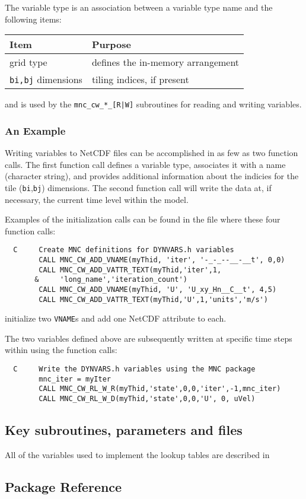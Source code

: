 The variable type is an association between a variable type name and the
following items:
\begin{center}
  \begin{tabular}[h]{|ll|}\hline
    \textbf{Item}  & \textbf{Purpose}  \\\hline
    grid type  &  defines the in-memory arrangement  \\
    \texttt{bi,bj} dimensions  &  tiling indices, if present  \\\hline
  \end{tabular}
\end{center}
and is used by the \texttt{mnc\_cw\_*\_[R|W]} subroutines for reading
and writing variables.


\subsubsection{An Example}

Writing variables to NetCDF files can be accomplished in as few as two
function calls.  The first function call defines a variable type,
associates it with a name (character string), and provides additional
information about the indicies for the tile (\texttt{bi},\texttt{bj})
dimensions.  The second function call will write the data at, if
necessary, the current time level within the model.

Examples of the initialization calls can be found in the file 
where these four function calls:
{\footnotesize
\begin{verbatim}
  C     Create MNC definitions for DYNVARS.h variables
        CALL MNC_CW_ADD_VNAME(myThid, 'iter', '-_-_--__-__t', 0,0)
        CALL MNC_CW_ADD_VATTR_TEXT(myThid,'iter',1,
       &     'long_name','iteration_count')
        CALL MNC_CW_ADD_VNAME(myThid, 'U', 'U_xy_Hn__C__t', 4,5)
        CALL MNC_CW_ADD_VATTR_TEXT(myThid,'U',1,'units','m/s')
\end{verbatim}
}
{\noindent initialize two \texttt{VNAME}s and add one NetCDF
  attribute to each.}
    
The two variables defined above are subsequently written at specific
time steps within
using the function calls:
{\footnotesize
\begin{verbatim}
  C     Write the DYNVARS.h variables using the MNC package
        mnc_iter = myIter
        CALL MNC_CW_RL_W_R(myThid,'state',0,0,'iter',-1,mnc_iter)
        CALL MNC_CW_RL_W_D(myThid,'state',0,0,'U', 0, uVel)
\end{verbatim}
}


\subsection{Key subroutines, parameters and files}

All of the variables used to implement the lookup tables are described
in 



\subsection{Package Reference}

